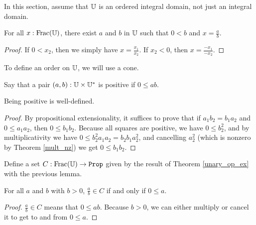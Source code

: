 \documentclass[../../math.tex]{subfiles}
\begin{document}
In this section, assume that $\mathbb{U}$ is an ordered integral domain, not just an
integral domain.

\begin{theorem} \label{frac_pos_ex} \label{frac_pos_ex_div}
    For all $x : \operatorname{Frac}(\mathbb{U})$, there exist $a$ and $b$ in $\mathbb{U}$ such that $0 < b$
    and $x = \frac{a}{b}$.
\end{theorem}
\begin{proof}
    If $0 < x_2$, then we simply have $x = \frac{x_1}{x_2}$.  If $x_2 < 0$, then
    $x = \frac{-x_1}{-x_2}$.
\end{proof}

To define an order on $\mathbb{U}$, we will use a cone.

\begin{definition}
    Say that a pair $(a, b) : \mathbb{U} \times \mathbb{U}^*$ is positive if $0 \leq ab$.
\end{definition}

\begin{lemma}
    Being positive is well-defined.
\end{lemma}
\begin{proof}
    By propositional extensionality, it suffices to prove that if $a_1b_2 =
    b_1a_2$ and $0 \leq a_1a_2$, then $0 \leq b_1b_2$.  Because all squares are
    positive, we have $0 \leq b_2^2$, and by multiplicativity we have $0 \leq
    b_2^2 a_1a_2 = b_2b_1a_2^2$, and cancelling $a_2^2$ (which is nonzero by
    Theorem \ref{mult_nz}) we get $0 \leq b_1b_2$.
\end{proof}

\begin{definition}
    Define a set $C : \set{\Frac(\U)}$ given by the result of Theorem
    \ref{unary_op_ex} with the previous lemma.
\end{definition}

\begin{lemma} \label{frac_pos_simpl}
    For all $a$ and $b$ with $b > 0$, $\frac{a}{b} \in C$ if and only if $0 \leq
    a$.
\end{lemma}
\begin{proof}
    $\frac{a}{b} \in C$ means that $0 \leq ab$.  Because $b > 0$, we can either
    multiply or cancel it to get to and from $0 \leq a$.
\end{proof}
\end{document}
